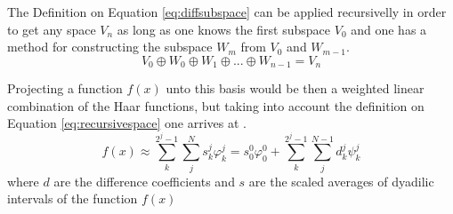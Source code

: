 \documentclass[../master_thesis.tex]{subfiles}
\begin{document}
The Definition on Equation \ref{eq:diffsubspace} can be applied recursivelly in order to
get any space $V_n$ as long as one knows the first subspace $V_0$ and one has a method for constructing the
subspace $W_m$ from $V_0$ and $W_{m-1}$.
\begin{equation}
    V_0 \oplus W_0 \oplus W_1 \oplus ... \oplus W_{n-1}  = V_n \label{eq:recursivespace}
\end{equation}

Projecting a function $f(x)$ unto this basis would be then a weighted linear combination
of the Haar functions, but taking into account the definition on Equation \ref{eq:recursivespace} one arrives
at \cite{Sorland}.
\begin{equation}\label{eq:projectftohaar}
  f(x)\approx \sum^{2^j -1}_k \sum^{N}_j s^j_k\varphi^j_k = s^0_0\varphi^0_0 + \sum^{2^j -1}_k \sum^{N - 1}_jd^j_k\psi^j_k
\end{equation}
where $d$ are the difference coefficients and $s$ are the scaled averages of dyadilic intervals of the function $f(x)$
\end{document}
